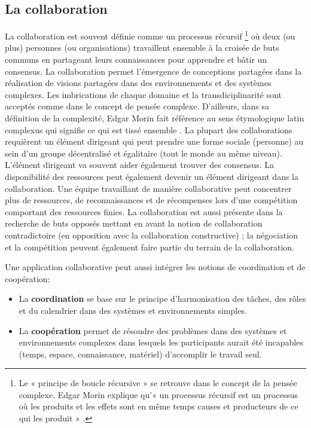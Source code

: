 


\subsection{La collaboration}
La collaboration  est souvent 
définie comme un processus récursif
\footnote{Le « principe de boucle 
	récursive » se retrouve dans le concept de la pensée complexe. Edgar Morin  
	explique qu'« un processus récursif est un processus où les produits et les 
	effets 
	sont en même temps causes et producteurs de ce qui les produit » 
	\cite[p. 100]{Morin1990}.} où deux (ou plus) personnes (ou organisations) 
travaillent ensemble à la croisée de buts communs 
en partageant leurs connaissances pour apprendre et bâtir un consensus. 
La collaboration permet l'émergence de conceptions partagées dans la réalisation 
de visions partagées dans des environnements et des systèmes complexes. 
Les imbrications de chaque domaine et la transdiciplinarité sont acceptés comme 
dans le concept de pensée complexe. D'ailleurs, dans sa définition de la 
complexité, Edgar Morin fait référence au sens étymologique latin \og 
complexus\fg{} qui signifie \og ce qui est tissé ensemble\fg{} \cite{Morin1990a}.
La plupart des collaborations requièrent un élément dirigeant qui peut prendre une 
forme sociale (personne) au sein d'un groupe décentralisé et égalitaire (tout le 
monde au même niveau). L'élément dirigeant va souvent aider également trouver 
des consensus. 
La disponibilité des ressources peut également devenir un élément dirigeant dans 
la collaboration.
Une équipe travaillant de manière collaborative peut concentrer plus de 
ressources, de reconnaissances et de récompenses lors d'une 
compétition comportant des ressources finies. 
La collaboration est aussi présente dans la recherche de buts opposés mettant en 
avant la notion de collaboration contradictoire (en opposition avec la collaboration 
constructive) ; la négociation et la compétition peuvent également faire partie du 
terrain 
de la collaboration.

Une application collaborative peut aussi intégrer les notions de coordination et de 
coopération:
\begin{itemize}
	\item La \textbf{coordination} se base sur le principe d'harmonisation des 
	tâches, des rôles et du calendrier dans des systèmes et environnements 
	simples.
	\item La \textbf{coopération} permet de résoudre des problèmes dans des 
	systèmes et environnements complexes dans lesquels les participants aurait été 
	incapables (temps, espace, connaissance, matériel) d'accomplir le travail seul.
\end{itemize}

